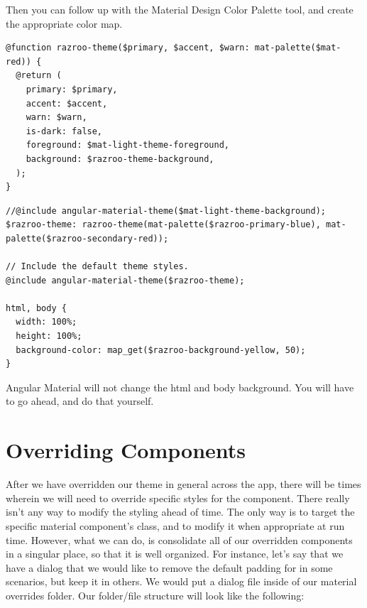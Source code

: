 Then you can follow up with the Material Design Color Palette tool, and
create the appropriate color map.

\begin{lstlisting}[caption=What custom theme function would look like]
@function razroo-theme($primary, $accent, $warn: mat-palette($mat-red)) {
  @return (
    primary: $primary,
    accent: $accent,
    warn: $warn,
    is-dark: false,
    foreground: $mat-light-theme-foreground,
    background: $razroo-theme-background,
  );
}  
\end{lstlisting}

\begin{lstlisting}[caption=html and body override]
//@include angular-material-theme($mat-light-theme-background);
$razroo-theme: razroo-theme(mat-palette($razroo-primary-blue), mat-palette($razroo-secondary-red));

// Include the default theme styles.
@include angular-material-theme($razroo-theme);  

html, body {
  width: 100%;
  height: 100%;
  background-color: map_get($razroo-background-yellow, 50);
}
\end{lstlisting}

Angular Material will not change the html and body background. You will have to
go ahead, and do that yourself. 

\section{Overriding Components}
After we have overridden our theme in general across the app, there will be 
times wherein we will need to override specific styles for the component. 
There really isn't any way to modify the styling ahead of time. The only way
is to target the specific material component's class, and to modify it when 
appropriate at run time. However, what we can do, is consolidate all of our 
overridden components in a singular place, so that it is well organized. For
instance, let's say that we have a dialog that we would like to remove the 
default padding for in some scenarios, but keep it in others. We would put a 
dialog file inside of our material overrides folder. Our folder/file structure 
will look like the following: 

